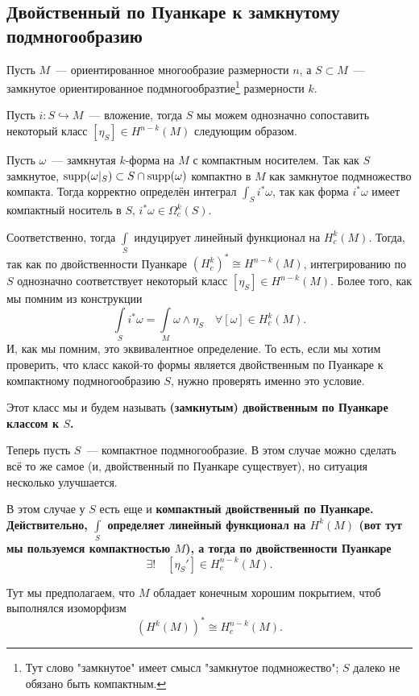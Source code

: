 \subsection{Двойственный по Пуанкаре к замкнутому подмногообразию}

	Пусть $M$~--- ориентированное многообразие размерности $n$, а $S \subset M$~--- замкнутое ориентированное подмногообразтие\footnote{Тут слово "замкнутое" имеет смысл "замкнутое подмножество"; $S$ далеко не обязано быть компактным. } размерности $k$.

	Пусть  $i\colon S \hookrightarrow M$~--- вложение, тогда $S$ мы можем однозначно сопоставить некоторый класс $[\eta_{S}] \in H^{n - k}(M)$ следующим образом. 

	Пусть $\omega$~--- замкнутая $k$-форма на $M$ с компактным носителем. Так как $S$ замкнутое, $\operatorname{supp}(\omega\vert_{S}) \subset S \cap \operatorname{supp}(\omega)$ компактно в $M$ как замкнутое подмножество компакта. Тогда корректно определён интеграл $\int_{S} i^* \omega$, так как форма $i^* \omega$ имеет компактный носитель в $S$, $i^* \omega \in \Omega_{c}^k(S)$. 

	Соответственно, тогда $\int\limits_{S}$ индуцирует линейный функционал на $H_{c}^k(M)$. Тогда, так как по двойственности Пуанкаре $(H_c^{k})^* \cong H^{n - k}(M)$, интегрированию по $S$ однозначно соответствует некоторый класс $[\eta_S] \in H^{n - k}(M)$. Более того, как мы помним из конструкции
	\[
		\int\limits_{S} i^* \omega = \int\limits_{M} \omega \wedge \eta_S \quad \forall [\omega] \in H^k_{c}(M).
	\]
	И, как мы помним, это эквивалентное определение. То есть, если мы хотим проверить, что класс какой-то формы является двойственным по Пуанкаре к компактному подмногообразию $S$, нужно проверять именно это условие. 

	Этот класс мы и будем называть \bf{(замкнутым) двойственным по Пуанкаре классом к $S$}. 


	Теперь пусть $S$~--- компактное подмногообразие. В этом случае можно сделать всё то же самое (и, двойственный по Пуанкаре существует), но ситуация несколько улучшается. 

	В этом случае у $S$ есть еще и \bf{компактный двойственный по Пуанкаре}. Действительно, $\int\limits_{S}$ определяет линейный функционал на $H^k(M)$ (вот тут мы пользуемся компактностью $M$), а тогда по двойственности Пуанкаре 
	\[
		\exists ! \quad [\eta_S'] \in H_c^{n - k}(M).
	\]

	Тут мы предполагаем, что $M$ обладает конечным хорошим покрытием, чтоб выполнялся изоморфизм 
	\[
		(H^k(M))^* \cong H_c^{n - k}(M).
	\]

